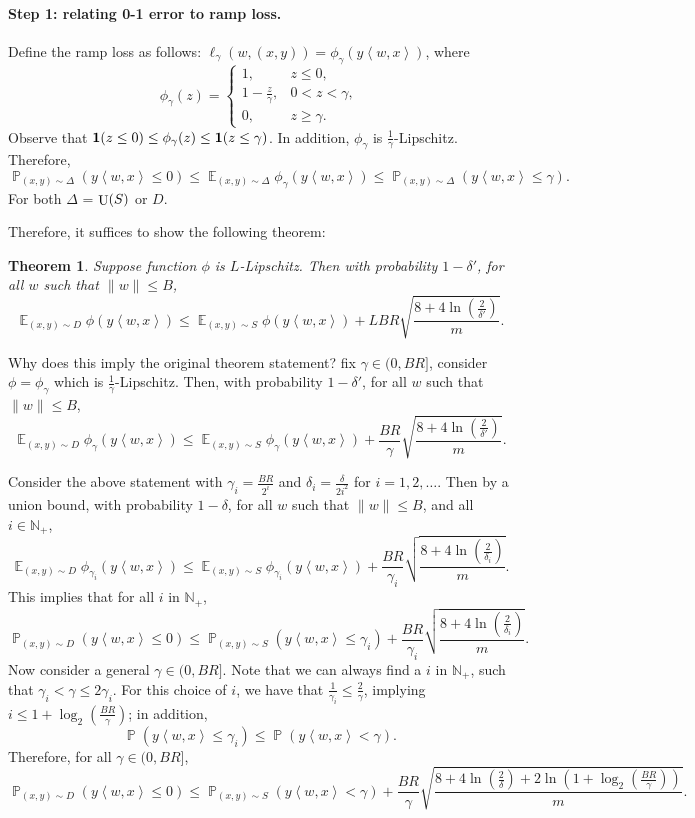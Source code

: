 \documentclass{article}
\newtheorem{theorem}{Theorem}
\DeclareMathOperator*{\U}{{\rm U}}
\DeclareMathOperator*{\EE}{{\mathbb E}}
\DeclareMathOperator{\PP}{{\mathbb P}}
\newcommand{\NN}{\mathbb{N}}
\newcommand*{\one}{{\bf 1}}
\newcommand{\inner}[2]{\left\langle #1,#2 \right\rangle}
\begin{document}
\paragraph{Step 1: relating 0-1 error to ramp loss.} Define the ramp loss as follows:
$\ell_\gamma(w, (x,y)) = \phi_\gamma(y \inner{w}{x})$, where
\[
  \phi_\gamma(z) = \begin{cases} 1,& z \leq 0, \\ 1 - \frac{z}{\gamma}, & 0 < z < \gamma, \\ 0, & z \geq \gamma. \end{cases}
\]
Observe that $\one(z \leq 0) \leq \phi_\gamma(z) \leq \one(z \leq \gamma)$. In addition, $\phi_\gamma$ is $\frac1\gamma$-Lipschitz. Therefore,
\[
   \PP_{(x,y) \sim \Delta}(y \inner{w}{x} \leq 0)
   \leq \EE_{(x,y) \sim \Delta} \phi_\gamma(y \inner{w}{x})
   \leq \PP_{(x,y) \sim \Delta}(y \inner{w}{x} \leq \gamma).
\]
For both $\Delta$ = $\U(S)$ or $D$.

Therefore, it suffices to show the following theorem:
\begin{theorem}
Suppose function $\phi$ is $L$-Lipschitz. Then with probability $1-\delta'$, for all $w$ such that $\| w \| \leq B$,
\[
  \EE_{(x,y) \sim D} \phi(y \inner{w}{x})
  \leq \EE_{(x,y) \sim S} \phi(y \inner{w}{x})
  + L B R \sqrt{\frac{8 + 4\ln(\frac{2}{\delta'})}{m}}.
\]
\label{thm:lip-uc}
\end{theorem}

Why does this imply the original theorem statement?
fix $\gamma \in (0, BR]$, consider $\phi = \phi_\gamma$ which is $\frac 1 \gamma$-Lipschitz. Then,
with probability $1-\delta'$, for all $w$ such that $\| w \| \leq B$,
\[
  \EE_{(x,y) \sim D} \phi_\gamma(y \inner{w}{x})
  \leq \EE_{(x,y) \sim S} \phi_\gamma(y \inner{w}{x})
  + \frac{BR}{\gamma} \sqrt{\frac{8 + 4\ln(\frac{2}{\delta'})}{m}}.
\]

Consider the above statement
with $\gamma_i = \frac{BR}{2^i}$ and $\delta_i = \frac{\delta}{2i^2}$ for $i = 1,2,\ldots$. Then by a union bound, with probability $1-\delta$, for all $w$
such that $\| w \| \leq B$, and all $i \in \NN_+$,
\[
  \EE_{(x,y) \sim D} \phi_{\gamma_i}(y \inner{w}{x})
  \leq \EE_{(x,y) \sim S} \phi_{\gamma_i}(y \inner{w}{x})
  + \frac{BR}{\gamma_i} \sqrt{\frac{8 + 4\ln(\frac{2}{\delta_i})}{m}}.
\]
This implies that for all $i$ in $\NN_+$,
\[
  \PP_{(x,y) \sim D}(y \inner{w}{x} \leq 0)
  \leq \PP_{(x,y) \sim S}(y \inner{w}{x} \leq \gamma_i) + \frac{BR}{\gamma_i} \sqrt{\frac{8 + 4\ln(\frac{2}{\delta_i})}{m}}.
\]
Now consider a general $\gamma \in (0,BR]$. Note that we can always find a
$i$ in $\NN_+$, such that $\gamma_i < \gamma \leq 2\gamma_i$. For this choice of $i$,
we have that $\frac{1}{\gamma_i} \leq \frac{2}{\gamma}$, implying $i \leq 1 + \log_2(\frac{BR}{\gamma})$; in addition,
\[ \PP(y\inner{w}{x} \leq \gamma_i) \leq \PP(y\inner{w}{x} < \gamma). \]
Therefore, for all $\gamma \in (0, BR]$,
\[
\PP_{(x,y) \sim D}(y \inner{w}{x} \leq 0)
\leq \PP_{(x,y) \sim S}(y \inner{w}{x} < \gamma) + \frac{BR}{\gamma} \sqrt{\frac{8 + 4\ln(\frac{2}{\delta}) + 2\ln(1+\log_2(\frac{BR}{\gamma}))}{m}}.
\]
\end{document}
